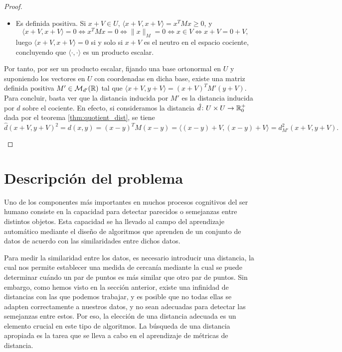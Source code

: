 \documentclass{book}
\begin{document}
\begin{proof}
\begin{enumerate}
\begin{itemize}
			\item Es definida positiva. Si $x + V \in U$, $\langle x + V, x + V \rangle = x^TMx \ge 0$, y
			\[ \langle x + V, x + V \rangle = 0 \iff x^TMx = 0 \iff \|x\|_M = 0 \iff x \in V \iff x+V = 0+V, \]
			luego $\langle x + V, x + V \rangle = 0$ si y solo si $x+V$ es el neutro en el espacio cociente, concluyendo que $\langle \cdot, \cdot \rangle$ es un producto escalar.
		\end{itemize}

		Por tanto, por ser un producto escalar, fijando una base ortonormal en $U$ y suponiendo los vectores en $U$ con coordenadas en dicha base, existe una matriz definida positiva $M' \in \mathcal{M}_{d'}(\mathbb{R})$ tal que $\langle x+V, y+V \rangle = (x+V)^TM'(y+V)$. Para concluir, basta ver que la distancia inducida por $M'$ es la distancia inducida por $d$ sobre el cociente. En efecto, si consideramos la distancia $\hat{d}\colon U \times U \to \mathbb{R}^+_0$ dada por el teorema \ref{thm:quotient_dist}, se tiene
		\[\hat{d}(x+V,y+V)^2 = d(x,y) = (x-y)^TM(x-y) = \langle (x-y)+V, (x-y)+V \rangle = d_{M'}^2(x+V,y+V).\]

	\end{enumerate}
\end{proof}


\section{Descripción del problema}
	Uno de los componentes más importantes en muchos procesos cognitivos del ser humano consiste en la capacidad para detectar parecidos o semejanzas entre distintos objetos. Esta capacidad se ha llevado al campo del aprendizaje automático mediante el diseño de algoritmos que aprenden de un conjunto de datos de acuerdo con las similaridades entre dichos datos.

	Para medir la similaridad entre los datos, es necesario introducir una distancia, la cual nos permite establecer una medida de cercanía mediante la cual se puede determinar cuándo un par de puntos es más similar que otro par de puntos. Sin embargo, como hemos visto en la sección anterior, existe una infinidad de distancias con las que podemos trabajar, y es posible que no todas ellas se adapten correctamente a nuestros datos, y no sean adecuadas para detectar las semejanzas entre estos. Por eso, la elección de una distancia adecuada es un elemento crucial en este tipo de algoritmos. La búsqueda de una distancia apropiada es la tarea que se lleva a cabo en el aprendizaje de métricas de distancia.
\end{document}
